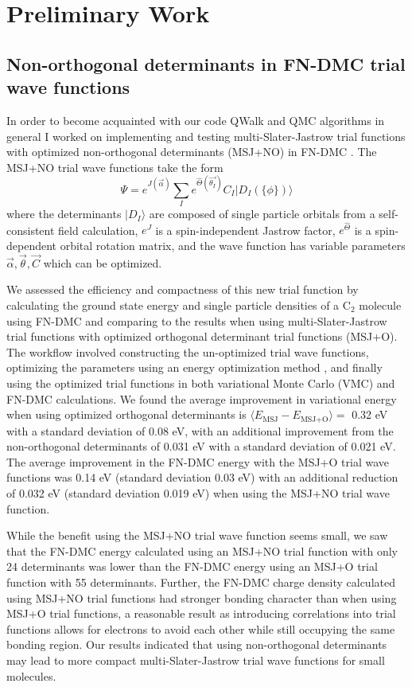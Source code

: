 \documentclass[12pt]{article}
\begin{document}
\section{Preliminary Work}
\subsection{Non-orthogonal determinants in FN-DMC trial wave functions}
In order to become acquainted with our code QWalk \cite{Wagner2009} and QMC algorithms in general I worked on implementing and testing multi-Slater-Jastrow trial functions with optimized non-orthogonal determinants (MSJ+NO) in FN-DMC \cite{doi:10.1063/1.5052906}.
The MSJ+NO trial wave functions take the form
\begin{equation}
\Psi=e^{J(\vec{\alpha})} \sum_I e^{\hat{\Theta}(\vec{\theta_I})} C_I |D_I (\{ \phi\})\rangle
\end{equation}
where the determinants $|D_I\rangle$ are composed of single particle orbitals from a self-consistent field calculation, $e^J$ is a spin-independent Jastrow factor, $e^{\hat{\Theta}}$ is a spin-dependent orbital rotation matrix, and the wave function has variable parameters $\vec{\alpha}, \vec{\theta}, \vec{C}$ which can be optimized.

We assessed the efficiency and compactness of this new trial function by calculating the ground state energy and single particle densities of a C$_2$ molecule using FN-DMC and comparing to the results when using multi-Slater-Jastrow trial functions with optimized orthogonal determinant trial functions (MSJ+O). 
The workflow involved constructing the un-optimized trial wave functions, optimizing the parameters using an energy optimization method \cite{Toulouse2007}, and finally using the optimized trial functions in both variational Monte Carlo (VMC) and FN-DMC calculations. 
We found the average improvement in variational energy when using optimized orthogonal determinants is $\langle E_\text{MSJ} - E_\text{MSJ+O} \rangle = $ 0.32 eV with a standard deviation of 0.08 eV, with an additional improvement from the non-orthogonal determinants of 0.031 eV with a standard deviation of 0.021 eV.
The average improvement in the FN-DMC energy with the MSJ+O trial wave functions was 0.14 eV (standard deviation 0.03 eV) with an additional reduction of 0.032 eV (standard deviation 0.019 eV) when using the MSJ+NO trial wave function.

While the benefit using the MSJ+NO trial wave function seems small, we saw that the FN-DMC energy calculated using an MSJ+NO trial function with only 24 determinants was lower than the FN-DMC energy using an MSJ+O trial function with 55 determinants.
Further, the FN-DMC charge density calculated using MSJ+NO trial functions had stronger bonding character than when using MSJ+O trial functions, a reasonable result as introducing correlations into trial functions allows for electrons to avoid each other while still occupying the same bonding region. 
Our results indicated that using non-orthogonal determinants may lead to more compact multi-Slater-Jastrow trial wave functions for small molecules.
\end{document}
